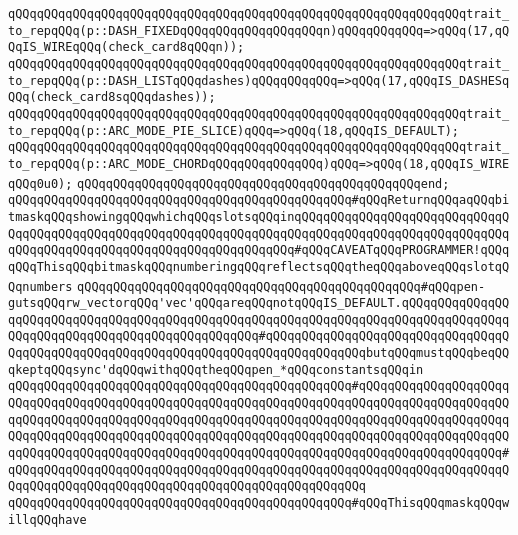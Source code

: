 \verb|qQQqqQQqqQQqqQQqqQQqqQQqqQQqqQQqqQQqqQQqqQQqqQQqqQQqqQQqqQQqqQQqtrait_to_repqQQq(p::DASH_FIXEDqQQqqQQqqQQqqQQqqQQqn)qQQqqQQqqQQq=>qQQq(17,qQQqIS_WIREqQQq(check_card8qQQqn));|\newline
\verb|qQQqqQQqqQQqqQQqqQQqqQQqqQQqqQQqqQQqqQQqqQQqqQQqqQQqqQQqqQQqqQQqtrait_to_repqQQq(p::DASH_LISTqQQqdashes)qQQqqQQqqQQq=>qQQq(17,qQQqIS_DASHESqQQq(check_card8sqQQqdashes));|\newline
\newline
\verb|qQQqqQQqqQQqqQQqqQQqqQQqqQQqqQQqqQQqqQQqqQQqqQQqqQQqqQQqqQQqqQQqtrait_to_repqQQq(p::ARC_MODE_PIE_SLICE)qQQq=>qQQq(18,qQQqIS_DEFAULT);|\newline
\verb|qQQqqQQqqQQqqQQqqQQqqQQqqQQqqQQqqQQqqQQqqQQqqQQqqQQqqQQqqQQqqQQqtrait_to_repqQQq(p::ARC_MODE_CHORDqQQqqQQqqQQqqQQq)qQQq=>qQQq(18,qQQqIS_WIREqQQq0u0);|\newline
\verb|qQQqqQQqqQQqqQQqqQQqqQQqqQQqqQQqqQQqqQQqqQQqqQQqend;|\newline
\newline
\verb|qQQqqQQqqQQqqQQqqQQqqQQqqQQqqQQqqQQqqQQqqQQqqQQq#qQQqReturnqQQqaqQQqbitmaskqQQqshowingqQQqwhichqQQqslotsqQQqinqQQqqQQqqQQqqQQqqQQqqQQqqQQqqQQqqQQqqQQqqQQqqQQqqQQqqQQqqQQqqQQqqQQqqQQqqQQqqQQqqQQqqQQqqQQqqQQqqQQqqQQqqQQqqQQqqQQqqQQqqQQqqQQqqQQqqQQqqQQq#qQQqCAVEATqQQqPROGRAMMER!qQQqqQQqThisqQQqbitmaskqQQqnumberingqQQqreflectsqQQqtheqQQqaboveqQQqslotqQQqnumbers|\newline
\verb|qQQqqQQqqQQqqQQqqQQqqQQqqQQqqQQqqQQqqQQqqQQqqQQq#qQQqpen-gutsqQQqrw_vectorqQQq'vec'qQQqareqQQqnotqQQqIS_DEFAULT.qQQqqQQqqQQqqQQqqQQqqQQqqQQqqQQqqQQqqQQqqQQqqQQqqQQqqQQqqQQqqQQqqQQqqQQqqQQqqQQqqQQqqQQqqQQqqQQqqQQqqQQqqQQqqQQqqQQqqQQq#qQQqqQQqqQQqqQQqqQQqqQQqqQQqqQQqqQQqqQQqqQQqqQQqqQQqqQQqqQQqqQQqqQQqqQQqqQQqqQQqqQQqbutqQQqmustqQQqbeqQQqkeptqQQqsync'dqQQqwithqQQqtheqQQqpen_*qQQqconstantsqQQqin|\newline
\verb|qQQqqQQqqQQqqQQqqQQqqQQqqQQqqQQqqQQqqQQqqQQqqQQq#qQQqqQQqqQQqqQQqqQQqqQQqqQQqqQQqqQQqqQQqqQQqqQQqqQQqqQQqqQQqqQQqqQQqqQQqqQQqqQQqqQQqqQQqqQQqqQQqqQQqqQQqqQQqqQQqqQQqqQQqqQQqqQQqqQQqqQQqqQQqqQQqqQQqqQQqqQQqqQQqqQQqqQQqqQQqqQQqqQQqqQQqqQQqqQQqqQQqqQQqqQQqqQQqqQQqqQQqqQQqqQQqqQQqqQQqqQQqqQQqqQQqqQQqqQQqqQQqqQQqqQQqqQQqqQQqqQQqqQQqqQQqqQQqqQQqqQQqqQQq#qQQqqQQqqQQqqQQqqQQqqQQqqQQqqQQqqQQqqQQqqQQqqQQqqQQqqQQqqQQqqQQqqQQqqQQqqQQqqQQqqQQqqQQqqQQq|\verb|qQQqqQQqqQQqqQQqqQQqqQQqqQQq|\newline
\verb|qQQqqQQqqQQqqQQqqQQqqQQqqQQqqQQqqQQqqQQqqQQqqQQq#qQQqThisqQQqmaskqQQqwillqQQqhave|\newline
